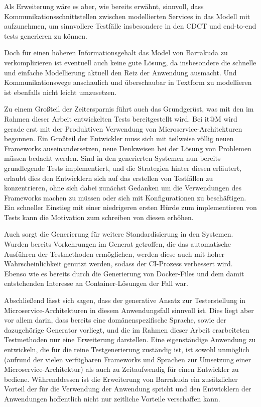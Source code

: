 \documentclass[12pt,a4paper,bibliography=totocnumbered,listof=totocnumbered]{scrartcl}
\begin{document}

Als Erweiterung wäre es aber, wie bereits erwähnt, sinnvoll, dass Kommunikationsschnittstellen zwischen modellierten Services in das Modell mit aufzunehmen, um sinnvollere Testfälle insbesondere in den \ac{CDCT} und end-to-end tests generieren zu können.

Doch für einen höheren Informationsgehalt das Model von Barrakuda zu verkomplizieren ist eventuell auch keine gute Lösung, da insbesondere die schnelle und einfache Modellierung aktuell den Reiz der Anwendung ausmacht. Und Kommunikationswege anschaulich und überschaubar in Textform zu modellieren ist ebenfalls nicht leicht umzusetzen.

Zu einem Großteil der Zeitersparnis führt auch das Grundgerüst, was mit den im Rahmen dieser Arbeit entwickelten Tests bereitgestellt wird. Bei it@M wird gerade erst mit der Produktiven Verwendung von Microservice-Architekturen begonnen. Ein Großteil der Entwickler muss sich mit teilweise völlig neuen Frameworks auseinandersetzen, neue Denkweisen bei der Lösung von Problemen müssen bedacht werden. Sind in den generierten Systemen nun bereits grundlegende Tests implementiert, und die Strategien hinter diesen erläutert, erlaubt dies den Entwicklern sich auf das erstellen von Testfällen zu konzentrieren, ohne sich dabei zunächst Gedanken um die Verwendungen des Frameworks machen zu müssen oder sich mit Konfigurationen zu beschäftigen. Ein schneller Einstieg mit einer niedrigeren ersten Hürde zum implementieren von Tests kann die Motivation zum schreiben von diesen erhöhen.

Auch sorgt die Generierung für weitere Standardisierung in den Systemen. Wurden bereits Vorkehrungen im Generat getroffen, die das automatische Ausführen der Testmethoden ermöglichen, werden diese auch mit hoher Wahrscheinlichkeit genutzt werden, sodass der \acs{CI}-Prozess verbessert wird. Ebenso wie es bereits durch die Generierung von Docker-Files und dem damit entstehenden Interesse an Container-Lösungen der Fall war.

Abschließend lässt sich sagen, dass der generative Ansatz zur Testerstellung in Microservice-Architekturen in diesem Anwendungsfall sinnvoll ist. Dies liegt aber vor allem darin, dass bereits eine domänenspezifische Sprache, sowie der dazugehörige Generator vorliegt, und die im Rahmen dieser Arbeit erarbeiteten Testmethoden nur eine Erweiterung darstellen. Eine eigenständige Anwendung zu entwickeln, die für die reine Testgenerierung zuständig ist, ist sowohl unmöglich (aufrund der vielen verfügbaren Frameworks und Sprachen zur Umsetzung einer Microservice-Architektur) als auch zu Zeitaufwendig für einen Entwickler zu bediene. Währenddessen ist die Erweiterung von Barrakuda ein zusätzlicher Vorteil der für die Verwendung der Anwendung spricht und den Entwicklern der Anwendungen hoffentlich nicht nur zeitliche Vorteile verschaffen kann.
\end{document}
